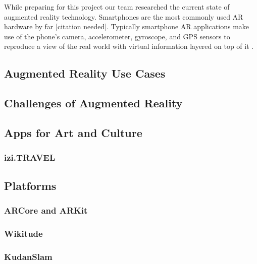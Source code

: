 \documentclass[a4paper, 10pt, american, titlepage]{article}
\begin{document}
While preparing for this project our team researched the current state of
augmented reality technology. Smartphones are the most commonly used AR
hardware by far [citation needed]. Typically smartphone AR applications make
use of the phone's camera, accelerometer, gyroscope, and GPS sensors to
reproduce a view of the real world with virtual information layered on top of
it \autocite{bonsor2018}.

\subsection{Augmented Reality Use Cases}
\label{sec:augmentedRealityUseCases}

\lipsum[1]

\subsection{Challenges of Augmented Reality}
\label{sec:challengesOfAugmentedReality}

\lipsum[1]

\subsection{Apps for Art and Culture}
\label{sec:appsForArtAndCulture}

\lipsum[2-3]

\subsubsection{izi.TRAVEL}
\label{sec:iziTravel}

\lipsum[4-5]

\subsection{Platforms}
\label{sec:platforms}

\subsubsection{ARCore and ARKit}
\label{sec:ARCoreAndARKit}

\subsubsection{Wikitude}
\label{sec:wikitude}

\subsubsection{KudanSlam}
\label{sec:kudanSlam}
\end{document}
